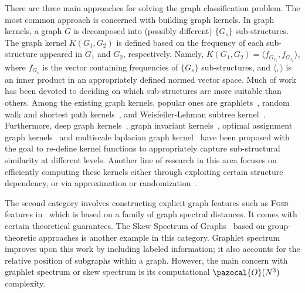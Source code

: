 \documentclass{article}
\newcommand{\BigO}{\pazocal{O}}
\begin{document}
There are three main approaches for solving the graph classification problem. The most common approach is concerned with building graph kernels. In graph kernels, a graph $G$ is decomposed into (possibly different) $\{G_{s}\}$ sub-structures. The graph kernel $K(G_1,G_2)$   is defined based on the frequency of each sub-structure appeared in $G_1$ and $G_2$, respectively. Namely, $K(G_1,G_2)=\langle f_{G_{s_1}},f_{G_{s_2}}\rangle$, where $f_{G_{s}}$ is the vector containing  frequencies of  $\{G_{s}\}$ sub-structures, and $\langle,\rangle$ is an inner product in an appropriately defined normed vector space. Much of work has been devoted to deciding on which sub-structures are more suitable than  others. Among the existing graph kernels, popular ones are  graphlets~\cite{prvzulj2007biological,shervashidze2009efficient}, random walk and shortest path kernels~\cite{kashima2003marginalized,borgwardt2005shortest}, and Weisfeiler-Lehman subtree kernel~\cite{shervashidze2011weisfeiler}. Furthermore, deep graph kernels~\cite{yanardag2015deep}, graph invariant  kernels~\cite{orsini2015graph}, optimal  assignment graph kernels~\cite{kriege2016valid}  and  multiscale laplacian graph kernel~\cite{kondor2016multiscale}  have been proposed with the goal to re-define kernel functions   to appropriately capture sub-structural similarity at different levels.  Another line of research in this area focuses on  efficiently computing  these kernels either through exploiting certain structure dependency, or via approximation or randomization~\cite{feragen2013scalable,de2013fast,neumann2012efficient}.  







The second category involves constructing explicit graph features such as  \textsc{Fgsd} features in~\cite{verma2017hunt} which is based on a family of graph spectral distances. It comes with certain theoretical guarantees. The Skew Spectrum of Graphs~\cite{kondor2008skew} based on group-theoretic approaches  is another  example in this category. Graphlet spectrum~\cite{kondor2009graphlet}  improves upon this work by including   labeled information; it also accounts for the relative position of subgraphs  within a graph. However, the main concern with   graphlet spectrum or  skew spectrum is its computational $\BigO(N^{3})$ complexity. 
\end{document}
